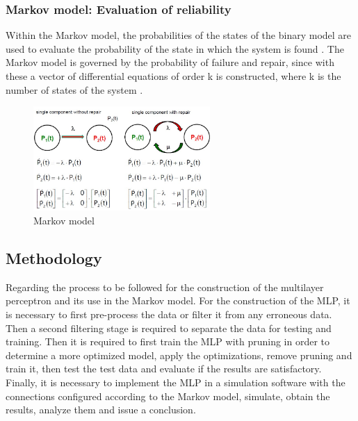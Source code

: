 \documentclass{article}
\begin{document}
\begin{doublespacing}
\begin{itemize}
\end{itemize}



\subsubsection{Markov model: Evaluation of reliability}
\par Within the Markov model, the probabilities of the states of the binary model are used to evaluate the probability of the state in which the system is found \cite{kaestner:Mark}. The Markov model is governed by the probability of failure and repair, since with these a vector of differential equations of order k is constructed, where k is the number of states of the system \cite{kaestner:Mark}.

\begin{figure}[H] 
    \centering
    \includegraphics[width=0.6\textwidth]{Images/Markov.JPG} 
    \caption{Markov model \cite{kaestner:Mark}} 
    \label{fig:Markov} 
\end{figure}




\subsection{Methodology}
\par Regarding the process to be followed for the construction of the multilayer perceptron and its use in the Markov model. For the construction of the MLP, it is necessary to first pre-process the data or filter it from any erroneous data. Then a second filtering stage is required to separate the data for testing and training. Then it is required to first train the MLP with pruning in order to determine a more optimized model, apply the optimizations, remove pruning and train it, then test the test data and evaluate if the results are satisfactory. Finally, it is necessary to implement the MLP in a simulation software with the connections configured according to the Markov model, simulate, obtain the results, analyze them and issue a conclusion. 






\end{doublespacing}
\end{document}
